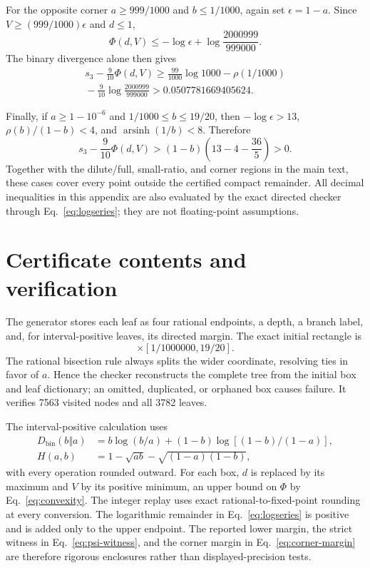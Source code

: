 \documentclass[aps,pra,reprint,superscriptaddress,nofootinbib,longbibliography,floatfix]{revtex4-2}
\newcommand{\asinh}{\operatorname{arsinh}}
\newcommand{\Dkl}{D_{\mathrm{bin}}}
\newcommand{\PhiF}{\Phi}
\begin{document}
For the opposite corner $a\geq999/1000$ and $b\leq1/1000$, again set $\epsilon=1-a$.  Since $V\geq(999/1000)\epsilon$ and $d\leq1$,
\begin{equation}
 \PhiF(d,V)\leq-\log\epsilon+
 \log\frac{2000999}{999000}.
\end{equation}
The binary divergence alone then gives
\begin{multline}
 s_3-\frac9{10}\PhiF(d,V)\geq
 \frac{99}{1000}\log1000-\rho(1/1000)\\
 {}-\frac9{10}\log\frac{2000999}{999000}
 >0.0507781669405624.
 \label{eq:corner-margin}
\end{multline}

Finally, if $a\geq1-10^{-6}$ and $1/1000\leq b\leq19/20$, then $-\log\epsilon>13$, $\rho(b)/(1-b)<4$, and $\asinh(1/b)<8$.  Therefore
\begin{equation}
 s_3-\frac9{10}\PhiF(d,V)
 >(1-b)\left(13-4-\frac{36}{5}\right)>0.
\end{equation}
Together with the dilute/full, small-ratio, and corner regions in the main text, these cases cover every point outside the certified compact remainder.  All decimal inequalities in this appendix are also evaluated by the exact directed checker through Eq.~\eqref{eq:logseries}; they are not floating-point assumptions.

\section{Certificate contents and verification}
\label{app:repro}

The generator stores each leaf as four rational endpoints, a depth, a branch label, and, for interval-positive leaves, its directed margin.  The exact initial rectangle is
\begin{equation}
 [1/20,999999/1000000]\times[1/1000000,19/20].
\end{equation}
The rational bisection rule always splits the wider coordinate, resolving ties in favor of $a$.  Hence the checker reconstructs the complete tree from the initial box and leaf dictionary; an omitted, duplicated, or orphaned box causes failure.  It verifies 7563 visited nodes and all 3782 leaves.

The interval-positive calculation uses
\begin{align}
 \Dkl(b\Vert a)&=b\log(b/a)+(1-b)\log[(1-b)/(1-a)],\\
 H(a,b)&=1-\sqrt{ab}-\sqrt{(1-a)(1-b)},
\end{align}
with every operation rounded outward.  For each box, $d$ is replaced by its maximum and $V$ by its positive minimum, an upper bound on $\PhiF$ by Eq.~\eqref{eq:convexity}.  The integer replay uses exact rational-to-fixed-point rounding at every conversion.  The logarithmic remainder in Eq.~\eqref{eq:logseries} is positive and is added only to the upper endpoint.  The reported lower margin, the strict witness in Eq.~\eqref{eq:psi-witness}, and the corner margin in Eq.~\eqref{eq:corner-margin} are therefore rigorous enclosures rather than displayed-precision tests.


\end{document}
